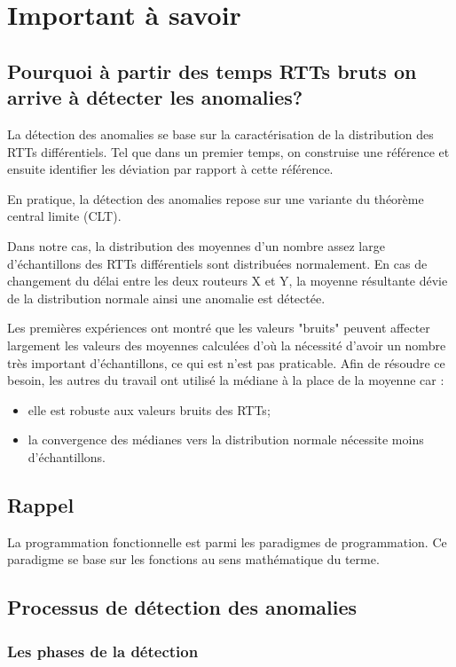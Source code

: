 
\chapter{Important à savoir}
\section{Pourquoi à partir des temps RTTs bruts on arrive à détecter les anomalies?}


La détection des anomalies se base sur la caractérisation de la distribution des RTTs différentiels. Tel que dans un premier temps, on construise une référence et ensuite identifier les déviation par rapport à cette référence.


En pratique, la détection des anomalies repose sur une variante du théorème central limite (CLT).

Dans notre cas, la distribution des moyennes d'un nombre assez large d'échantillons des RTTs différentiels sont distribuées normalement. En cas de changement du délai entre les deux routeurs X et Y, la moyenne résultante dévie de la distribution normale ainsi une anomalie est détectée.


Les premières expériences ont montré que les valeurs "bruits" peuvent affecter largement les valeurs des moyennes calculées d'où la nécessité d'avoir un nombre très important d'échantillons, ce qui est n'est pas praticable. Afin de résoudre ce besoin, les autres du travail ont utilisé la médiane à la place de la moyenne car :

\begin{itemize}
	\item elle est robuste aux valeurs bruits des RTTs;
	\item la convergence des médianes vers la distribution normale nécessite moins d'échantillons. 
\end{itemize}


\section{Rappel}
La programmation fonctionnelle est parmi les paradigmes de programmation.  Ce paradigme se base sur les fonctions au sens mathématique du terme.
 
 \section{Processus de détection des anomalies}
 \subsection{Les phases de la détection }
